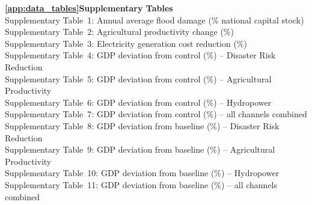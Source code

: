 \documentclass[
  final,
  10pt,
  letterpaper,
  english,
]{article}
\begin{document}
{  \noindent\textbf{\ref{app:data_tables}\enspace Supplementary Tables}\dotfill\pageref{app:data_tables}\\[0.3em]
  \hspace*{2em}Supplementary Table~1: Annual average flood damage (\% national capital stock)\dotfill\pageref{tab:drr_impact_channel_KHM}\\[0.15em]
  \hspace*{2em}Supplementary Table~2: Agricultural productivity change (\%)\dotfill\pageref{tab:agri_impact_channel_KHM}\\[0.15em]
  \hspace*{2em}Supplementary Table~3: Electricity generation cost reduction (\%)\dotfill\pageref{tab:hydropower_impact_channel_KHM}\\[0.15em]
  \hspace*{2em}Supplementary Table~4: GDP deviation from control (\%) -- Disaster Risk Reduction\dotfill\pageref{tab:results_DRR_control_rel}\\[0.15em]
  \hspace*{2em}Supplementary Table~5: GDP deviation from control (\%) -- Agricultural Productivity\dotfill\pageref{tab:results_AGR_control_rel}\\[0.15em]
  \hspace*{2em}Supplementary Table~6: GDP deviation from control (\%) -- Hydropower\dotfill\pageref{tab:results_HYD_control_rel}\\[0.15em]
  \hspace*{2em}Supplementary Table~7: GDP deviation from control (\%) -- all channels combined\dotfill\pageref{tab:results_All_control_rel}\\[0.15em]
  \hspace*{2em}Supplementary Table~8: GDP deviation from baseline (\%) -- Disaster Risk Reduction\dotfill\pageref{tab:results_DRR_baseline_rel}\\[0.15em]
  \hspace*{2em}Supplementary Table~9: GDP deviation from baseline (\%) -- Agricultural Productivity\dotfill\pageref{tab:results_AGR_baseline_rel}\\[0.15em]
  \hspace*{2em}Supplementary Table~10: GDP deviation from baseline (\%) -- Hydropower\dotfill\pageref{tab:results_HYD_baseline_rel}\\[0.15em]
  \hspace*{2em}Supplementary Table~11: GDP deviation from baseline (\%) -- all channels combined\dotfill\pageref{tab:results_All_baseline_rel}
}
\end{document}
